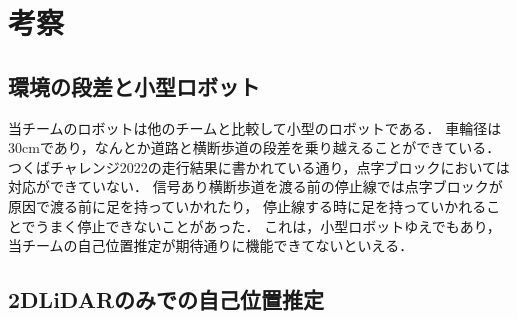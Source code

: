 \documentclass[twocolumn,9pt]{jsproceedings}
\begin{document}








\section{考察}

\subsection{環境の段差と小型ロボット}

当チームのロボットは他のチームと比較して小型のロボットである．
車輪径は30cmであり，なんとか道路と横断歩道の段差を乗り越えることができている．
つくばチャレンジ2022の走行結果に書かれている通り，点字ブロックにおいては対応ができていない．
信号あり横断歩道を渡る前の停止線では点字ブロックが原因で渡る前に足を持っていかれたり，
停止線する時に足を持っていかれることでうまく停止できないことがあった．
これは，小型ロボットゆえでもあり，当チームの自己位置推定が期待通りに機能できてないといえる．

\subsection{2DLiDARのみでの自己位置推定}
\end{document}
